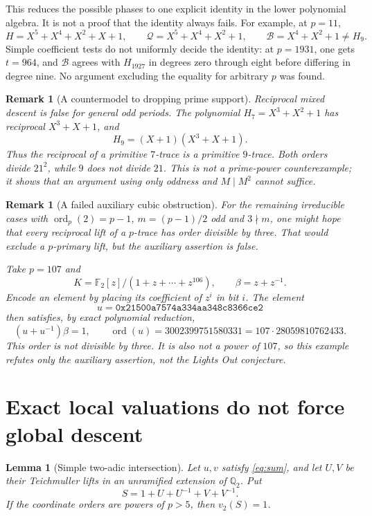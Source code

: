 \documentclass[a4paper]{article}
\newtheorem{lemma}[theorem]{Lemma}
\newtheorem{remark}[theorem]{Remark}
\DeclareMathOperator{\ord}{ord}
\newcommand{\F}{\mathbb F}
\newcommand{\Q}{\mathbb Q}
\begin{document}
This reduces the possible phases to one explicit identity in the lower
polynomial algebra.  It is not a proof that the identity always fails.
For example, at $p=11$,
\[
 H=X^5+X^4+X^2+X+1,\qquad
 \mathcal Q=X^5+X^4+X^2+1,\qquad
 \mathcal B=X^4+X^2+1\ne H_9.
\]
Simple coefficient tests do not uniformly decide the identity:
at $p=1931$, one gets $t=964$, and $\mathcal B$ agrees with
$H_{1927}$ in degrees zero through eight before differing in degree
nine.  No argument excluding the equality for arbitrary $p$ was found.

\begin{remark}[A countermodel to dropping prime support]
Reciprocal mixed descent is false for general odd periods.
The polynomial $H_7=X^3+X^2+1$ has reciprocal
$X^3+X+1$, and
\[
 H_9=(X+1)(X^3+X+1).
\]
Thus the reciprocal of a primitive $7$-trace is a primitive $9$-trace.
Both orders divide $21^2$, while $9$ does not divide $21$.
This is not a prime-power counterexample; it shows that an argument
using only oddness and $M\mid M^2$ cannot suffice.
\end{remark}

\begin{remark}[A failed auxiliary cubic obstruction]
For the remaining irreducible cases with
$\ord_p(2)=p-1$, $m=(p-1)/2$ odd and $3\nmid m$, one might hope that
every reciprocal lift of a $p$-trace has order divisible by three.
That would exclude a $p$-primary lift, but the auxiliary assertion is
false.

Take $p=107$ and
\[
 K=\F_2[z]/(1+z+\cdots+z^{106}),\qquad \beta=z+z^{-1}.
\]
Encode an element by placing its coefficient of $z^i$ in bit $i$.
The element
\[
 u=\texttt{0x21500a7574a334aa348c8366ce2}
\]
then satisfies, by exact polynomial reduction,
\[
 (u+u^{-1})\beta=1,\qquad
 \ord(u)=3002399751580331
       =107\cdot28059810762433.
\]
This order is not divisible by three.
It is also not a power of $107$, so this example refutes only the
auxiliary assertion, not the Lights Out conjecture.
\end{remark}

\section{Exact local valuations do not force global descent}

\begin{lemma}[Simple two-adic intersection]\label{lem:carry}
Let $u,v$ satisfy \eqref{eq:sum}, and let $U,V$ be their Teichmuller
lifts in an unramified extension of $\Q_2$.
Put
\[
 S=1+U+U^{-1}+V+V^{-1}.
\]
If the coordinate orders are powers of $p>5$, then $v_2(S)=1$.
\end{lemma}
\end{document}
